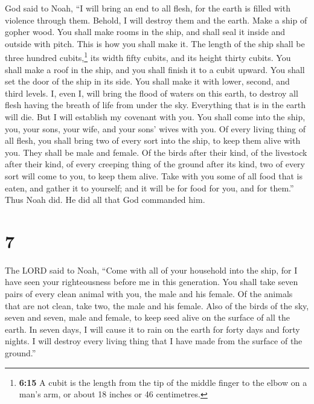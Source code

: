  God said to Noah, ``I will bring an end to all flesh,
for the earth is filled with violence through them. Behold, I will
destroy them and the earth.  Make a ship of gopher wood.
You shall make rooms in the ship, and shall seal it inside and outside
with pitch.  This is how you shall make it. The length of
the ship shall be three hundred cubits,\footnote{\textbf{6:15} A cubit
  is the length from the tip of the middle finger to the elbow on a
  man's arm, or about 18 inches or 46 centimetres.} its width fifty
cubits, and its height thirty cubits.  You shall make a
roof in the ship, and you shall finish it to a cubit upward. You shall
set the door of the ship in its side. You shall make it with lower,
second, and third levels.  I, even I, will bring the
flood of waters on this earth, to destroy all flesh having the breath of
life from under the sky. Everything that is in the earth will die.
 But I will establish my covenant with you. You shall
come into the ship, you, your sons, your wife, and your sons' wives with
you.  Of every living thing of all flesh, you shall bring
two of every sort into the ship, to keep them alive with you. They shall
be male and female.  Of the birds after their kind, of
the livestock after their kind, of every creeping thing of the ground
after its kind, two of every sort will come to you, to keep them alive.
 Take with you some of all food that is eaten, and gather
it to yourself; and it will be for food for you, and for them.''
 Thus Noah did. He did all that God commanded him.

\hypertarget{section-6}{%
\section{7}\label{section-6}}

 The LORD said to Noah, ``Come with all of your household
into the ship, for I have seen your righteousness before me in this
generation.  You shall take seven pairs of every clean
animal with you, the male and his female. Of the animals that are not
clean, take two, the male and his female.  Also of the
birds of the sky, seven and seven, male and female, to keep seed alive
on the surface of all the earth.  In seven days, I will
cause it to rain on the earth for forty days and forty nights. I will
destroy every living thing that I have made from the surface of the
ground.''

